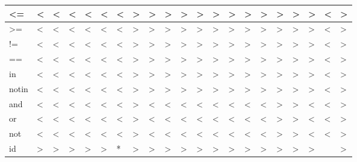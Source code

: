 \begin{tabular}{|l|l|l|l|l|l|l|l|l|l|l|l|l|l|l|l|l|l|l|l|l|}
\hline
\textless=&\textless&\textless&\textless&\textless&\textless&\textless&\textgreater&\textgreater&\textgreater&\textgreater&\textgreater&\textgreater&\textgreater&\textgreater&\textgreater&\textgreater&\textgreater&\textgreater&\textless&\textgreater\\
\hline
\textgreater=&\textless&\textless&\textless&\textless&\textless&\textless&\textgreater&\textgreater&\textgreater&\textgreater&\textgreater&\textgreater&\textgreater&\textgreater&\textgreater&\textgreater&\textgreater&\textgreater&\textless&\textgreater\\
\hline
!=&\textless&\textless&\textless&\textless&\textless&\textless&\textgreater&\textgreater&\textgreater&\textgreater&\textgreater&\textgreater&\textgreater&\textgreater&\textgreater&\textgreater&\textgreater&\textgreater&\textless&\textgreater\\
\hline
 ==&\textless&\textless&\textless&\textless&\textless&\textless&\textgreater&\textgreater&\textgreater&\textgreater&\textgreater&\textgreater&\textgreater&\textgreater&\textgreater&\textgreater&\textgreater&\textgreater&\textless&\textgreater\\
\hline
in&\textless&\textless&\textless&\textless&\textless&\textless&\textgreater&\textgreater&\textgreater&\textgreater&\textgreater&\textgreater&\textgreater&\textgreater&\textgreater&\textgreater&\textgreater&\textgreater&\textless&\textgreater\\
\hline
notin&\textless&\textless&\textless&\textless&\textless&\textless&\textgreater&\textgreater&\textgreater&\textgreater&\textgreater&\textgreater&\textgreater&\textgreater&\textgreater&\textgreater&\textgreater&\textgreater&\textless&\textgreater\\
\hline
and&\textless&\textless&\textless&\textless&\textless&\textless&\textgreater&\textless&\textless&\textless&\textless&\textless&\textless&\textless&\textless&\textgreater&\textgreater&\textless&\textless&\textgreater\\
\hline
or&\textless&\textless&\textless&\textless&\textless&\textless&\textgreater&\textless&\textless&\textless&\textless&\textless&\textless&\textless&\textless&\textgreater&\textgreater&\textless&\textless&\textgreater\\
\hline
not&\textless&\textless&\textless&\textless&\textless&\textless&\textgreater&\textless&\textless&\textless&\textless&\textless&\textless&\textless&\textless&\textgreater&\textgreater&\textless&\textless&\textgreater\\
\hline
id&\textgreater&\textgreater&\textgreater&\textgreater&\textgreater&*&\textgreater&\textgreater&\textgreater&\textgreater&\textgreater&\textgreater&\textgreater&\textgreater&\textgreater&\textgreater&\textgreater&\textgreater&&\textgreater\\

\end{tabular}
